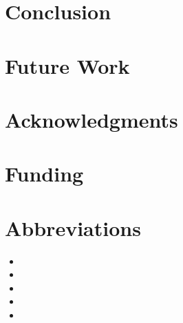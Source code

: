 \documentclass[utf8]{frontiersinFPHY_FAMS}
\begin{document}
\section{Conclusion}

\section{Future Work}

\section{Acknowledgments}

\section{Funding}



\section{Abbreviations}
\begin{itemize}
	\item 
	\item
	\item 
	\item 
	\item 
\end{itemize}



\end{document}
